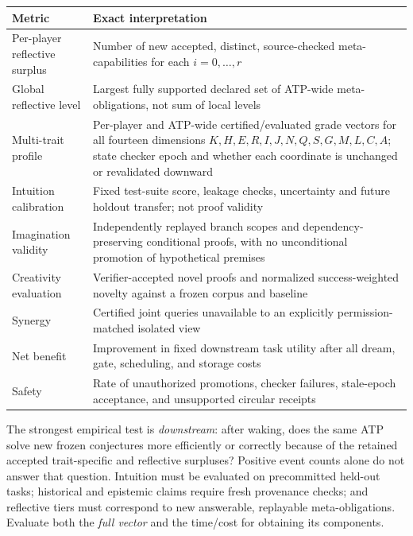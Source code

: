 \documentclass[11pt,letterpaper]{article}
\theoremstyle{definition}
\theoremstyle{plain}
\theoremstyle{definition}
\begin{document}
\begin{center}\small
\begin{tabularx}{\linewidth}{@{}lX@{}}\toprule
Metric & Exact interpretation\\\midrule
Per-player reflective surplus & Number of new accepted, distinct, source-checked meta-capabilities for each $i=0,\ldots,r$\\
Global reflective level & Largest fully supported declared set of ATP-wide meta-obligations, not sum of local levels\\
Multi-trait profile & Per-player and ATP-wide certified/evaluated grade vectors for all fourteen dimensions $K,H,E,R,I,J,N,Q,S,G,M,L,C,A$; state checker epoch and whether each coordinate is unchanged or revalidated downward\\
Intuition calibration & Fixed test-suite score, leakage checks, uncertainty and future holdout transfer; not proof validity\\
Imagination validity & Independently replayed branch scopes and dependency-preserving conditional proofs, with no unconditional promotion of hypothetical premises\\
Creativity evaluation & Verifier-accepted novel proofs and normalized success-weighted novelty against a frozen corpus and baseline\\
Synergy & Certified joint queries unavailable to an explicitly permission-matched isolated view\\
Net benefit & Improvement in fixed downstream task utility after all dream, gate, scheduling, and storage costs\\
Safety & Rate of unauthorized promotions, checker failures, stale-epoch acceptance, and unsupported circular receipts\\\bottomrule
\end{tabularx}
\end{center}

The strongest empirical test is \emph{downstream}: after waking, does the same ATP solve new frozen conjectures more efficiently or correctly because of the retained accepted trait-specific and reflective surpluses? Positive event counts alone do not answer that question. Intuition must be evaluated on precommitted held-out tasks; historical and epistemic claims require fresh provenance checks; and reflective tiers must correspond to new answerable, replayable meta-obligations. Evaluate both the \emph{full vector} and the time/cost for obtaining its components.
\end{document}
